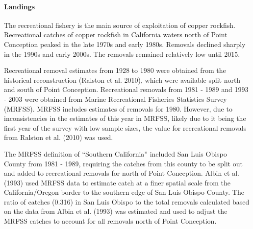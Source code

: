 \documentclass[11pt,
  english,
  a4paper,
]{article}
\begin{document}
\leavevmode\tagmcend\tagstructend


\hypertarget{landings-1}{%
\paragraph{Landings}\label{landings-1}}

\leavevmode\tagmcend\tagstructend


The recreational fishery is the main source of exploitation of copper rockfish. Recreational catches of copper rockfish in California waters north of Point Conception peaked in the late 1970s and early 1980s. Removals declined sharply in the 1990s and early 2000s. The removals remained relatively low until 2015.

\leavevmode\tagmcend\tagstructend\par


Recreational removal estimates from 1928 to 1980 were obtained from the historical reconstruction {(Ralston et al. 2010)\leavevmode\tagmcend\tagstructend}, which were available split north and south of Point Conception. Recreational removals from 1981 - 1989 and 1993 - 2003 were obtained from Marine Recreational Fisheries Statistics Survey (MRFSS). MRFSS includes estimates of removals for 1980. However, due to inconsistencies in the estimates of this year in MRFSS, likely due to it being the first year of the survey with low sample sizes, the value for recreational removals from Ralston et al. {(2010)\leavevmode\tagmcend\tagstructend} was used.

\leavevmode\tagmcend\tagstructend\par


The MRFSS definition of ``Southern California'' included San Luis Obispo County from 1981 - 1989, requiring the catches from this county to be split out and added to recreational removals for north of Point Conception. Albin et al. {(1993)\leavevmode\tagmcend\tagstructend} used MRFSS data to estimate catch at a finer spatial scale from the California/Oregon border to the southern edge of San Luis Obispo County. The ratio of catches (0.316) in San Luis Obispo to the total removals calculated based on the data from Albin et al. {(1993)\leavevmode\tagmcend\tagstructend} was estimated and used to adjust the MRFSS catches to account for all removals north of Point Conception.
\end{document}
